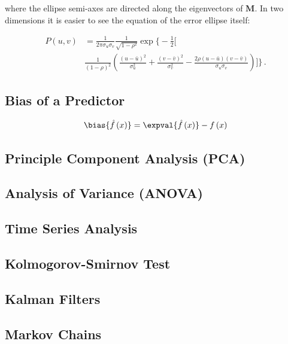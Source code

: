 \noindent where the ellipse semi-axes are directed along the eigenvectors of $\mathbf{M}$.
In two dimensions it is easier to see the equation of the error ellipse itself:

\begin{equation}\label{eq:stats:P_error_ellipse_2}
\begin{split}
P\left(u,v\right) &= \frac{1}{2\pi\sigma_{u}\sigma_{v}}\frac{1}{\sqrt{1-\rho^{2}}}\exp\bigg\{-\frac{1}{2}\bigg[ \\
&\frac{1}{(1-\rho)^{2}}\left(\frac{\left(u-\bar{u}\right)^{2}}{\sigma_{u}^{2}}+\frac{\left(v-\bar{v}\right)^{2}}{\sigma_{v}^{2}}-\frac{2\rho \left(u-\bar{u}\right)\left(v-\bar{v}\right)}{\sigma_{u}\sigma_{v}}\right)\bigg]\bigg\}\,.
\end{split}
\end{equation}

\subsection{Bias of a Predictor}
\label{additional:stats:bias}

\begin{equation}\label{eq:stats:bias}
\bias{\hat{f}\left(x\right)} = \expval{\hat{f}\left(x\right)} - f\left(x\right)
\end{equation}

\subsection{Principle Component Analysis (PCA)}
\label{additional:stats:PCA}

\subsection{Analysis of Variance (ANOVA)}
\label{additional:stats:ANOVA}

\subsection{Time Series Analysis}
\label{additional:stats:time_series_ana}

\subsection{Kolmogorov-Smirnov Test}
\label{additional:misc:KS_test}

\subsection{Kalman Filters}
\label{additional:misc:kalman_filters}

\subsection{Markov Chains}
\label{additional:misc:markov_chains}

